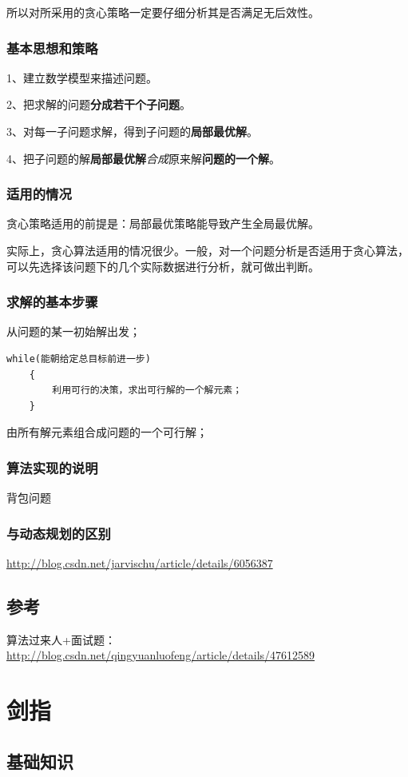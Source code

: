 \documentclass[UTF8,a4paper,12pt]{ctexbook}
\begin{document}
			所以对所采用的贪心策略一定要仔细分析其是否满足无后效性。
		\subsection{基本思想和策略}
			1、建立数学模型来描述问题。
			
			2、把求解的问题\textbf{分成若干个子问题}。
			
			3、对每一子问题求解，得到子问题的\textbf{局部最优解}。
			
			4、把子问题的解\textbf{局部最优解}\textit{合成}原来解\textbf{问题的一个解}。
		\subsection{适用的情况}
			贪心策略适用的前提是：局部最优策略能导致产生全局最优解。
			
			实际上，贪心算法适用的情况很少。一般，对一个问题分析是否适用于贪心算法，可以先选择该问题下的几个实际数据进行分析，就可做出判断。
		\subsection{求解的基本步骤}
			从问题的某一初始解出发；
			\begin{lstlisting}[frame=L]
	while(能朝给定总目标前进一步) 	     
	{     
		利用可行的决策，求出可行解的一个解元素；    
	} 
			\end{lstlisting}
			
			由所有解元素组合成问题的一个可行解；
		\subsection{算法实现的说明}
			背包问题
		
		\subsection{与动态规划的区别}
			\url{http://blog.csdn.net/jarvischu/article/details/6056387}	
			
	\section{参考}
		算法过来人+面试题：\url{http://blog.csdn.net/qingyuanluofeng/article/details/47612589}	

\chapter{剑指}
	\section{基础知识}
\end{document}

